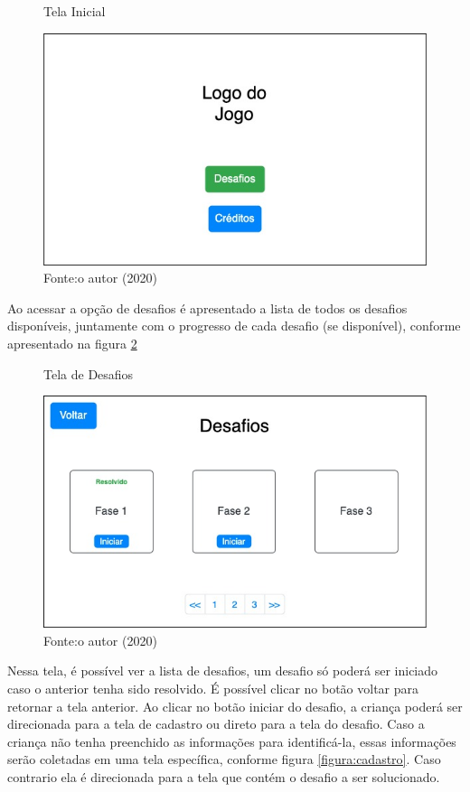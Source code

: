     \begin{figure}[h!]
        \centering
        \caption{Tela Inicial}
        \includegraphics[width=12cm]{images/cap3/Tela Inicial.jpg}
        \caption*{Fonte:o autor (2020)}
        \label{figura:tela_inicial}
    \end{figure}
    
    Ao acessar a opção de desafios é apresentado a lista de todos os desafios disponíveis, juntamente com o progresso de cada desafio (se disponível), conforme apresentado na figura \ref{figura:tela_desafios}
    
    \begin{figure}[h!]
        \centering
        \caption{Tela de Desafios}
        \includegraphics[width=12cm]{images/cap3/tela_desafios.jpg}
        \caption*{Fonte:o autor (2020)}
        \label{figura:tela_desafios}
    \end{figure}
    
    Nessa tela, é possível ver a lista de desafios, um desafio só poderá ser iniciado caso o anterior tenha sido resolvido.
    É possível clicar no botão voltar para retornar a tela anterior.
    Ao clicar no botão iniciar do desafio, a criança poderá ser direcionada para a tela de cadastro ou direto para a tela do desafio.
    Caso a criança não tenha preenchido as informações para identificá-la, essas informações serão coletadas em uma tela específica, conforme figura \ref{figura:cadastro}. Caso contrario ela é direcionada para a tela que contém o desafio a ser solucionado.
    
